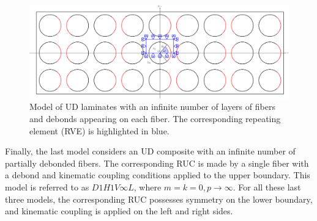 \documentclass[review]{elsarticle}
\begin{document}
\begin{figure}[!h]
\centering
\includegraphics[width=\textwidth]{thickPlyAllDebonds.pdf}
\caption{Model of UD laminates with an infinite number of  layers of fibers and debonds appearing on each fiber. The corresponding repeating element (RVE) is highlighted in blue.}\label{fig:thickplyalldebonds}
\end{figure}

Finally, the last model considers an UD composite with an infinite number of partially debonded fibers. The corresponding RUC is made by a single fiber with a debond and kinematic coupling conditions applied to the upper boundary. This model is referred to as $D1H1V\infty L$, where $m=k=0,p\rightarrow\infty$. For all these last three models, the corresponding RUC possesses symmetry on the lower boundary, and kinematic coupling is applied on the left and right sides.
\end{document}
